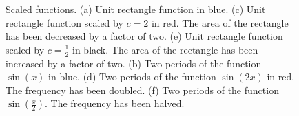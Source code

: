 \begin{figure}[htb!]
\hspace{5pt}%
%
\caption[]{Scaled functions. (a) Unit rectangle function in blue. (c) Unit rectangle function scaled by $c=2$ in red. The area of the rectangle has been decreased by a factor of two. (e) Unit rectangle function scaled by $c=\frac{1}{2}$ in black. The area of the rectangle has been increased by a factor of two. (b) Two periods of the function $\sin(x)$ in blue. (d) Two periods of the function $\sin(2 x)$ in red. The frequency has been doubled. (f) Two periods of the function $\sin(\frac{x}{2})$. The frequency has been halved. }
    \label{fig:ScaledFunctions}
\end{figure}





